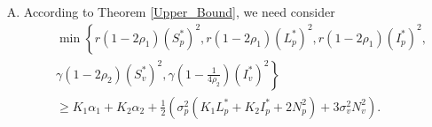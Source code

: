 \begin{enumerate}[(C)]
	\item
		According to Theorem \ref{Upper_Bound}, we need consider  
	\begin{align*}
		&
		\min
			\left\{
			r (1 - 2 \rho_1) (S_p ^* ) ^ 2,
			r (1 - 2 \rho_1) (L_p ^ *) ^ 2, 
			r(1 - 2 \rho_1) (I_p ^ *) ^ 2,
		\right.
		\\
		&
		\left.
		 	\gamma 
		 	(1 - 2 \rho_2) (S_v ^* ) ^ 2,
		 	\gamma
		 	\left(
		 		1 - 
		 		\frac{1}{4 \rho_2}
		 	\right)
		 	(I_v ^* ) ^ 2
		\right\}
		\\
		& \geq 
		K_1 \alpha_1 + 
		K_2 \alpha_2 + 
		\frac{1}{2}
		\left(
		 	\sigma_p ^ 2
		 	\left(
		 		K_1 L_p ^* +
		 		K_2 I_p ^* + 
		 		2N_p ^2 
		 	\right) + 
		 	3 \sigma_v ^ 2 N_v ^ 2
		\right).
	\end{align*} 
\end{enumerate}
%
